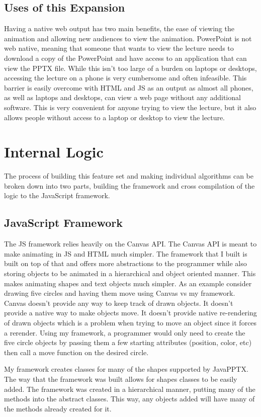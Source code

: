 \documentclass[12pt,twoside]{reedthesis}
\begin{document}
\subsection{Uses of this Expansion}
Having a native web output has two main benefits, the ease of viewing the animation and allowing new audiences to view the animation. PowerPoint is not web native, meaning that someone that wants to view the lecture needs to download a copy of the PowerPoint and have access to an application that can view the PPTX file. While this isn't too large of a burden on laptops or desktops, accessing the lecture on a phone is very cumbersome and often infeasible. This barrier is easily overcome with HTML and JS as an output as almost all phones, as well as laptops and desktops, can view a web page without any additional software. This is very convenient for anyone trying to view the lecture, but it also allows people without access to a laptop or desktop to view the lecture. 

\section{Internal Logic}
The process of building this feature set and making individual algorithms can be broken down into two parts, building the framework and cross compilation of the logic to the JavaScript framework.

\subsection{JavaScript Framework}
The JS framework relies heavily on the Canvas API. The Canvas API is meant to make animating in JS and HTML much simpler. The framework that I built is built on top of that and offers more abstractions to the programmer while also storing objects to be animated in a hierarchical and object oriented manner. This makes animating shapes and text objects much simpler. As an example consider drawing five circles and having them move using Canvas vs my framework. Canvas doesn't provide any way to keep track of drawn objects. It doesn't provide a native way to make objects move. It doesn't provide native re-rendering of drawn objects which is a problem when trying to move an object since it forces a rerender. Using my framework, a programmer would only need to create the five circle objects by passing them a few starting attributes (position, color, etc) then call a move function on the desired circle.

My framework creates classes for many of the shapes supported by JavaPPTX. The way that the framework was built allows for shapes classes to be easily added. The framework was created in a hierarchical manner, putting many of the methods into the abstract classes. This way, any objects added will have many of the methods already created for it. 
\end{document}

